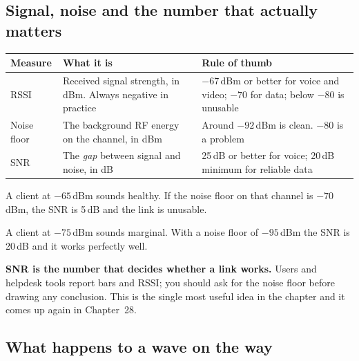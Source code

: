 \subsection{Signal, noise and the number that actually matters}

\begin{longtable}{@{}L{2.8cm}L{5.5cm}L{6.7cm}@{}}
\toprule
{}
\textbf{Measure} & \textbf{What it is} & \textbf{Rule of thumb} \\
\midrule
\endhead
RSSI &
Received signal strength, in dBm. Always negative in practice &
$-67$\,dBm or better for voice and video; $-70$ for data;
below $-80$ is unusable \\
Noise floor &
The background RF energy on the channel, in dBm &
Around $-92$\,dBm is clean. $-80$ is a problem \\
SNR &
The \emph{gap} between signal and noise, in dB &
25\,dB or better for voice; 20\,dB minimum for reliable data \\
\bottomrule
\end{longtable}

\begin{alertbox}
A client at $-65$\,dBm sounds healthy. If the noise floor on that channel is
$-70$\,dBm, the SNR is 5\,dB and the link is unusable.

A client at $-75$\,dBm sounds marginal. With a noise floor of $-95$\,dBm the SNR
is 20\,dB and it works perfectly well.

\textbf{SNR is the number that decides whether a link works.} Users and helpdesk
tools report bars and RSSI; you should ask for the noise floor before drawing any
conclusion. This is the single most useful idea in the chapter and it comes up
again in Chapter~28.
\end{alertbox}

\subsection{What happens to a wave on the way}

